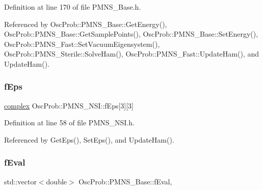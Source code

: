Definition at line 170 of file P\+M\+N\+S\+\_\+\+Base.\+h.



Referenced by Osc\+Prob\+::\+P\+M\+N\+S\+\_\+\+Base\+::\+Get\+Energy(), Osc\+Prob\+::\+P\+M\+N\+S\+\_\+\+Base\+::\+Get\+Sample\+Points(), Osc\+Prob\+::\+P\+M\+N\+S\+\_\+\+Base\+::\+Set\+Energy(), Osc\+Prob\+::\+P\+M\+N\+S\+\_\+\+Fast\+::\+Set\+Vacuum\+Eigensystem(), Osc\+Prob\+::\+P\+M\+N\+S\+\_\+\+Sterile\+::\+Solve\+Ham(), Osc\+Prob\+::\+P\+M\+N\+S\+\_\+\+Fast\+::\+Update\+Ham(), and Update\+Ham().

\mbox{\label{classOscProb_1_1PMNS__NSI_a7e2f0a3fdc633f68523c9de0ce76e67d}} 
\subsubsection{\texorpdfstring{f\+Eps}{fEps}}
{\footnotesize\ttfamily \hyperlink{classOscProb_1_1PMNS__Base_ae86ec4718808ce9d02e5f5b4226714ab}{complex} Osc\+Prob\+::\+P\+M\+N\+S\+\_\+\+N\+S\+I\+::f\+Eps\mbox{[}3\mbox{]}\mbox{[}3\mbox{]}\hspace{0.3cm}{\ttfamily [protected]}}



Definition at line 58 of file P\+M\+N\+S\+\_\+\+N\+S\+I.\+h.



Referenced by Get\+Eps(), Set\+Eps(), and Update\+Ham().

\mbox{\label{classOscProb_1_1PMNS__Base_a6319c34d7decbb9d7d6da279c06e8c2d}} 
\subsubsection{\texorpdfstring{f\+Eval}{fEval}}
{\footnotesize\ttfamily std\+::vector$<$double$>$ Osc\+Prob\+::\+P\+M\+N\+S\+\_\+\+Base\+::f\+Eval\hspace{0.3cm}{\ttfamily [protected]}, {\ttfamily [inherited]}}



